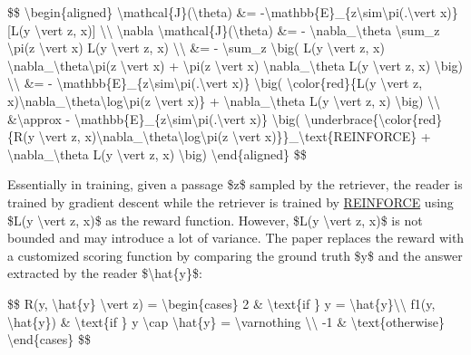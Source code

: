 \$\$ \textbackslash begin\{aligned\} \textbackslash mathcal\{J\}(\textbackslash theta) \&= -\textbackslash mathbb\{E\}\_\{z\textbackslash sim\textbackslash pi(.\textbackslash vert x)\} {[}L(y \textbackslash vert z, x){]} \textbackslash\textbackslash{} \textbackslash nabla \textbackslash mathcal\{J\}(\textbackslash theta) \&= - \textbackslash nabla\_\textbackslash theta \textbackslash sum\_z \textbackslash pi(z \textbackslash vert x) L(y \textbackslash vert z, x) \textbackslash\textbackslash{} \&= - \textbackslash sum\_z \textbackslash big( L(y \textbackslash vert z, x) \textbackslash nabla\_\textbackslash theta\textbackslash pi(z \textbackslash vert x) + \textbackslash pi(z \textbackslash vert x) \textbackslash nabla\_\textbackslash theta L(y \textbackslash vert z, x) \textbackslash big) \textbackslash\textbackslash{} \&= - \textbackslash mathbb\{E\}\_\{z\textbackslash sim\textbackslash pi(.\textbackslash vert x)\} \textbackslash big( \textbackslash color\{red\}\{L(y \textbackslash vert z, x)\textbackslash nabla\_\textbackslash theta\textbackslash log\textbackslash pi(z \textbackslash vert x)\} + \textbackslash nabla\_\textbackslash theta L(y \textbackslash vert z, x) \textbackslash big) \textbackslash\textbackslash{} \&\textbackslash approx - \textbackslash mathbb\{E\}\_\{z\textbackslash sim\textbackslash pi(.\textbackslash vert x)\} \textbackslash big( \textbackslash underbrace\{\textbackslash color\{red\}\{R(y \textbackslash vert z, x)\textbackslash nabla\_\textbackslash theta\textbackslash log\textbackslash pi(z \textbackslash vert x)\}\}\_\textbackslash text\{REINFORCE\} + \textbackslash nabla\_\textbackslash theta L(y \textbackslash vert z, x) \textbackslash big) \textbackslash end\{aligned\} \$\$

Essentially in training, given a passage \$z\$ sampled by the retriever, the reader is trained by gradient descent while the retriever is trained by \href{https://lilianweng.github.io/posts/2018-04-08-policy-gradient/\#reinforce}{REINFORCE} using \$L(y \textbackslash vert z, x)\$ as the reward function. However, \$L(y \textbackslash vert z, x)\$ is not bounded and may introduce a lot of variance. The paper replaces the reward with a customized scoring function by comparing the ground truth \$y\$ and the answer extracted by the reader \$\textbackslash hat\{y\}\$:

\$\$ R(y, \textbackslash hat\{y\} \textbackslash vert z) = \textbackslash begin\{cases\} 2 \& \textbackslash text\{if \} y = \textbackslash hat\{y\}\textbackslash\textbackslash{} f1(y, \textbackslash hat\{y\}) \& \textbackslash text\{if \} y \textbackslash cap \textbackslash hat\{y\} = \textbackslash varnothing \textbackslash\textbackslash{} -1 \& \textbackslash text\{otherwise\} \textbackslash end\{cases\} \$\$

